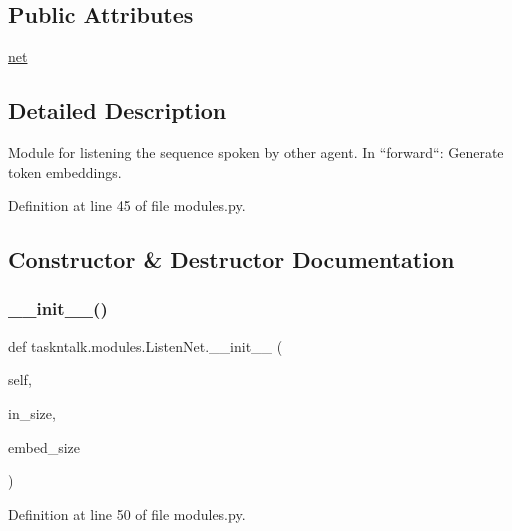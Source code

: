 \subsection*{Public Attributes}
\begin{DoxyCompactItemize}
\item 
\hyperlink{classtaskntalk_1_1modules_1_1ListenNet_a6c6adcc5e789fa48715cd8754b3cb28e}{net}
\end{DoxyCompactItemize}


\subsection{Detailed Description}
\begin{DoxyVerb}Module for listening the sequence spoken by other agent. In ``forward``:
Generate token embeddings.
\end{DoxyVerb}
 

Definition at line 45 of file modules.\+py.



\subsection{Constructor \& Destructor Documentation}
\mbox{\label{classtaskntalk_1_1modules_1_1ListenNet_ae2da147c71b06ac6c35f5f76b4972408}} 
\subsubsection{\texorpdfstring{\+\_\+\+\_\+init\+\_\+\+\_\+()}{\_\_init\_\_()}}
{\footnotesize\ttfamily def taskntalk.\+modules.\+Listen\+Net.\+\_\+\+\_\+init\+\_\+\+\_\+ (\begin{DoxyParamCaption}\item[{}]{self,  }\item[{}]{in\+\_\+size,  }\item[{}]{embed\+\_\+size }\end{DoxyParamCaption})}



Definition at line 50 of file modules.\+py.



